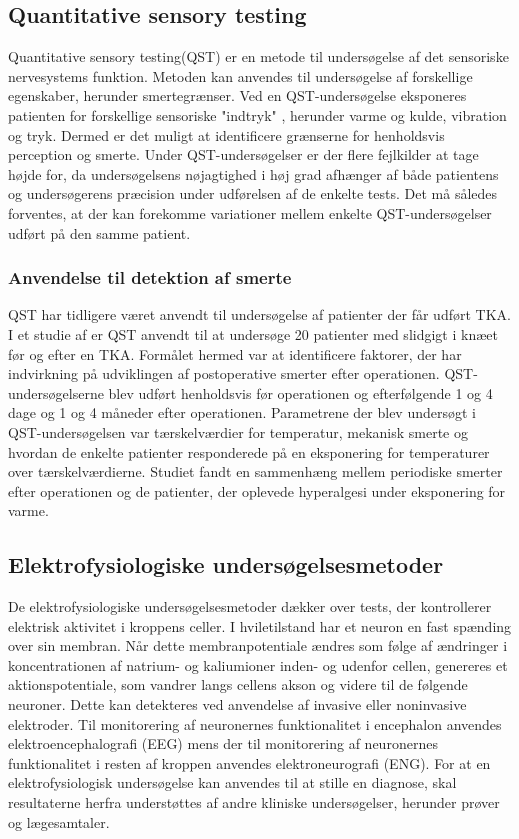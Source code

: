 \subsection{Quantitative sensory testing}
Quantitative sensory testing(QST) er en metode til undersøgelse af det sensoriske nervesystems funktion. Metoden kan anvendes til undersøgelse af forskellige egenskaber, herunder smertegrænser. Ved en QST-undersøgelse eksponeres patienten for forskellige sensoriske "indtryk" , herunder varme og kulde, vibration og tryk. Dermed er det muligt at identificere grænserne for henholdsvis perception og smerte. Under QST-undersøgelser er der flere fejlkilder at tage højde for, da undersøgelsens nøjagtighed i høj grad afhænger af både patientens og undersøgerens præcision under udførelsen af de enkelte tests. Det må således forventes, at der kan forekomme variationer mellem enkelte QST-undersøgelser udført på den samme patient. \citep{4}

\subsubsection{Anvendelse til detektion af smerte}
QST har tidligere været anvendt til undersøgelse af patienter der får udført TKA. I et studie af \citep{5} er QST anvendt til at undersøge 20 patienter med slidgigt i knæet før og efter en TKA. Formålet hermed var at identificere faktorer, der har indvirkning på udviklingen af postoperative smerter efter operationen. QST-undersøgelserne blev udført henholdsvis før operationen og efterfølgende 1 og 4 dage og 1 og 4 måneder efter operationen. Parametrene der blev undersøgt i QST-undersøgelsen var tærskelværdier for temperatur, mekanisk smerte og hvordan de enkelte patienter responderede på en eksponering for temperaturer over tærskelværdierne. Studiet fandt en sammenhæng mellem periodiske smerter efter operationen og de patienter, der oplevede hyperalgesi under eksponering for varme. \citep{5} 

\subsection{Elektrofysiologiske undersøgelsesmetoder}
De elektrofysiologiske undersøgelsesmetoder dækker over tests, der kontrollerer elektrisk aktivitet i kroppens celler. I hviletilstand har et neuron en fast spænding over sin membran. Når dette membranpotentiale ændres som følge af ændringer i koncentrationen af natrium- og kaliumioner inden- og udenfor cellen, genereres et aktionspotentiale, som vandrer langs cellens akson og videre til de følgende neuroner. Dette kan detekteres ved anvendelse af invasive eller noninvasive elektroder. Til monitorering af neuronernes funktionalitet i encephalon anvendes elektroencephalografi (EEG) mens der til monitorering af neuronernes funktionalitet i resten af kroppen anvendes elektroneurografi (ENG). For at en elektrofysiologisk undersøgelse kan anvendes til at stille en diagnose, skal resultaterne herfra understøttes af andre kliniske undersøgelser, herunder prøver og lægesamtaler. \citep{6}

